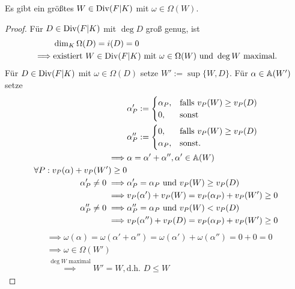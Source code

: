 \begin{lemma}
    Es gibt ein größtes $W \in \operatorname{Div}(F|K)$ mit $\omega\in\Omega(W)$.
\end{lemma}
\begin{proof}
    Für $D \in \operatorname{Div}(F|K)$ mit $\deg D$ groß genug, ist
    \begin{align*}
        & \dim_K \Omega(D) = i(D) = 0\\
        \implies & \text{existiert } W\in\operatorname{Div}(F|K) \text{ mit } \omega \in \Omega(W) \text{ und } \deg W \text{ maximal.}    
    \end{align*}
    Für $D \in \operatorname{Div}(F|K)$ mit $\omega \in \Omega(D)$ setze $W' := \sup\{W,D\}$.
    Für $\alpha \in \mathbb{A}(W')$ setze
    \begin{align*}
        &\alpha_P' := \begin{cases}
            \alpha_P, & \text{falls } v_P(W) \geq v_P(D)\\
            0, & \text{sonst}
        \end{cases}\\
        &\alpha_P'' := \begin{cases}
            0, & \text{falls } v_P(W) \geq v_P(D)\\
            \alpha_P, & \text{sonst}.
        \end{cases}\\
        \implies & \alpha = \alpha' + \alpha'', \alpha' \in \mathbb{A}(W)\\
        \forall P: v_P(\alpha) + v_P(W') \geq 0\\
        \alpha_P' \ne 0 \implies & \alpha_P' = \alpha_P \text{ und } v_P(W) \geq v_P(D)\\
        \implies & v_P(\alpha') + v_P(W) = v_P(\alpha_P) + v_P(W') \geq 0\\
        \alpha_P'' \neq 0 \implies & \alpha_P'' = \alpha_P \text{ und } v_P(W)< v_P(D) \\
        \implies & v_P(\alpha'') + v_P(D) = v_P(\alpha_P) + v_P(W') \geq 0\\
    \end{align*}
    \begin{align*}
        &\implies \omega(\alpha) = \omega(\alpha' + \alpha'') = \omega(\alpha') + \omega(\alpha'') = 0 + 0 = 0\\
        &\implies \omega \in \Omega(W')\\
        &\stackrel{\deg W \text{ maximal}}{\implies} W' =W, \text{d.h. } D \leq W
    \end{align*}
\end{proof}

